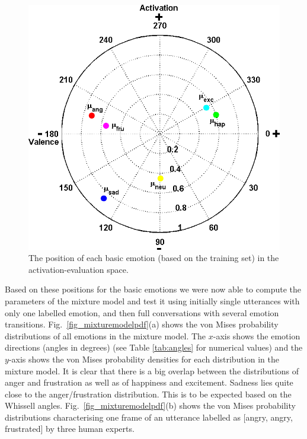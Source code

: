 \documentclass[10pt,journal,cspaper,compsoc]{IEEEtran}
\begin{document}
\begin{figure}[tp!]
      \centering
      \includegraphics[scale=0.45]{figures/Ch6/emotion_space_model_4.png}
      \caption{The position of each basic emotion (based on the training set) in the activation-evaluation space.}
      \label{fig_emotionspacemodel}
\end{figure}


Based on these positions for the basic emotions we were now able to compute the parameters of the mixture model and test it using initially single utterances with only one labelled emotion, and then full conversations with several emotion transitions. Fig.~\ref{fig_mixturemodelpdf}(a) shows the von Mises probability distributions of all emotions in the mixture model. The $x$-axis shows the emotion directions (angles in degrees) (see Table \ref{tab:angles} for numerical values) and the $y$-axis shows the von Mises probability densities for each distribution in the mixture model. It is clear that there is a big overlap between the distributions of anger and frustration as well as of happiness and excitement. Sadness lies quite close to the anger/frustration distribution. This is to be expected based on the Whissell angles. Fig.~\ref{fig_mixturemodelpdf}(b) shows the von Mises probability distributions characterising one frame of an utterance labelled as [angry, angry, frustrated] by three human experts.
\end{document}
